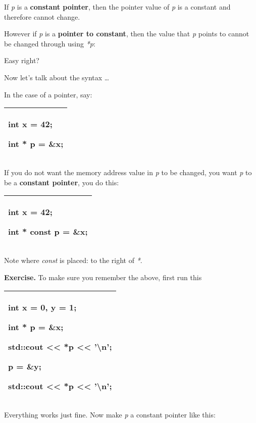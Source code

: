 \documentclass[
]{article}
\begin{document}
If \emph{p} is a \textbf{constant pointer}, then the pointer value of
\emph{p} is a constant and therefore cannot change.

However if \emph{p} is a \textbf{pointer to constant}, then the value
that \emph{p} points to cannot be changed through using \emph{*p}:

Easy right?

Now let's talk about the syntax \ldots{}

In the case of a pointer, say:

\begin{longtable}[]{@{}l@{}}
\toprule
\endhead
\begin{minipage}[t]{0.97\columnwidth}\raggedright
int x = 42;

int * p = \&x;\strut
\end{minipage}\tabularnewline
\bottomrule
\end{longtable}

If you do not want the memory address value in \emph{p} to be changed,
you want \emph{p} to be a \textbf{constant pointer}, you do this:

\begin{longtable}[]{@{}l@{}}
\toprule
\endhead
\begin{minipage}[t]{0.97\columnwidth}\raggedright
int x = 42;

int * \textbf{const} p = \&x;\strut
\end{minipage}\tabularnewline
\bottomrule
\end{longtable}

Note where \emph{const} is placed: to the right of \emph{*}.

\textbf{Exercise.} To make sure you remember the above, first run this

\begin{longtable}[]{@{}l@{}}
\toprule
\endhead
\begin{minipage}[t]{0.97\columnwidth}\raggedright
int x = 0, y = 1;

int * p = \&x;

std::cout \textless\textless{} *p \textless\textless{}
'\textbackslash n';

p = \&y;

std::cout \textless\textless{} *p \textless\textless{}
'\textbackslash n'; \strut
\end{minipage}\tabularnewline
\bottomrule
\end{longtable}

Everything works just fine. Now make \emph{p} a constant pointer like
this:
\end{document}
